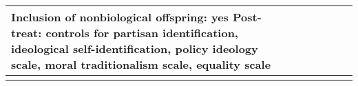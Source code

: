 \begin{longtable}{p{}p{}p{}p{}p{}p{}p{}}
Inclusion of nonbiological offspring: yes
Post-treat: controls for partisan identification, ideological self-identification, policy ideology scale, moral traditionalism scale, equality scale \\ 
   \bottomrule
\label{tab:lit}
\end{longtable}
\endgroup
